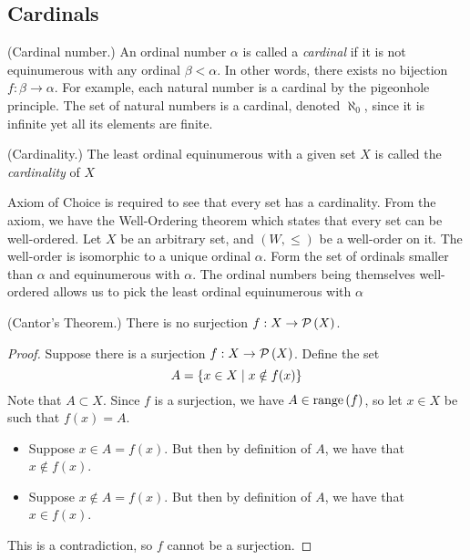 \documentclass[11pt]{article}
\begin{document}
\subsection{Cardinals}

\begin{defn}{(Cardinal number.)}
    An ordinal number $\alpha$ is called a \emph{cardinal} if it is not
    equinumerous with any ordinal $\beta < \alpha$.
    In other words, there exists no bijection $f : \beta \to \alpha$.
    For example, each natural number is a cardinal by the pigeonhole principle.
    The set of natural numbers is a cardinal, denoted $\aleph_0$, since it is
    infinite yet all its elements are finite.
\end{defn}

\begin{defn}{(Cardinality.)}
    The least ordinal equinumerous with a given set $X$ is called the
    \emph{cardinality} of $X$
\end{defn}

\begin{rem}
    Axiom of Choice is required to see that every set has a cardinality.
    From the axiom, we have the Well-Ordering theorem which states that every
    set can be well-ordered.
    Let $X$ be an arbitrary set, and $(W, \leq)$ be a well-order on it.
    The well-order is isomorphic to a unique ordinal $\alpha$.
    Form the set of ordinals smaller than $\alpha$ and equinumerous with
    $\alpha$.
    The ordinal numbers being themselves well-ordered allows us to pick the
    least ordinal equinumerous with $\alpha$
\end{rem}

\begin{prop}{(Cantor's Theorem.)}
    There is no surjection $f : X \to \operatorname{\mathcal{P}}{\left(X\right)}$.
\end{prop}

\begin{proof}
    Suppose there is a surjection $f : X \to \operatorname{\mathcal{P}}{\left(X\right)}$.
    Define the set
    \begin{equation*}
        A = \left\{
            x \in X \;\vert\;
            x \notin f(x)
        \right\}
    \end{equation*}
    Note that $A \subset X$.
    Since $f$ is a surjection, we have $A \in \operatorname{range}{\left(f\right)}$,
    so let $x \in X$ be such that $f(x) = A$.

    \begin{itemize}
        \item
            Suppose $x \in A = f(x)$.
            But then by definition of $A$, we have that $x \notin f(x)$.
        \item
            Suppose $x \notin A = f(x)$.
            But then by definition of $A$, we have that $x \in f(x)$.
    \end{itemize}

    This is a contradiction, so $f$ cannot be a surjection.
\end{proof}
\end{document}
